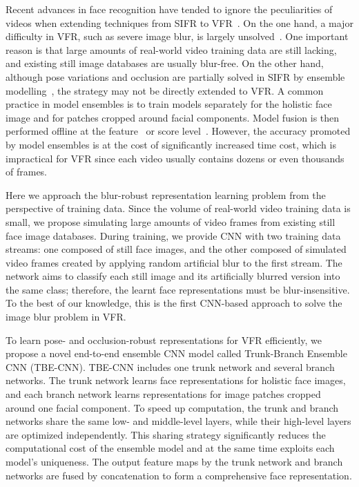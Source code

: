 \documentclass[10pt,journal,cspaper,compsoc]{IEEEtran}
\begin{document}
Recent advances in face recognition have tended to ignore the peculiarities of videos when extending techniques from SIFR to VFR~\cite{schroff2015facenet,sun2015deeply,parkhi2015deep,li2015hierarchical}.
On the one hand, a major difficulty in VFR, such as severe image blur, is largely unsolved~\cite{Ross2015report}.
One important reason is that large amounts of real-world video training data are still lacking,
and existing still image databases are usually blur-free.
On the other hand, although pose variations and occlusion are partially solved in SIFR by ensemble modelling~\cite{sun2015deeply,liu2015targeting},
the strategy may not be directly extended to VFR.
A common practice in model ensembles is to train models separately for the holistic face image and for patches cropped around facial components.
Model fusion is then performed offline at the feature~\cite{sun2014deep} or score level~\cite{ding2014multi}.
However, the accuracy promoted by model ensembles is at the cost of significantly increased time cost,
which is impractical for VFR since each video usually contains dozens or even thousands of frames.

Here we approach the blur-robust representation learning problem from the perspective of training data.
Since the volume of real-world video training data is small,
we propose simulating large amounts of video frames from existing still face image databases.
During training, we provide CNN with two training data streams:
one composed of still face images, and the other composed of simulated video frames created by applying random artificial blur to the first stream.
The network aims to classify each still image and its artificially blurred version into the same class; therefore, the learnt face representations must be blur-insensitive.
To the best of our knowledge, this is the first CNN-based approach to solve the image blur problem in VFR.

To learn pose- and occlusion-robust representations for VFR efficiently,
we propose a novel end-to-end ensemble CNN model called Trunk-Branch Ensemble CNN (TBE-CNN).
TBE-CNN includes one trunk network and several branch networks. The trunk network learns face representations for holistic face images,
and each branch network learns representations for image patches cropped around one facial component.
To speed up computation, the trunk and branch networks share the same low- and middle-level layers,
while their high-level layers are optimized independently.
This sharing strategy significantly reduces the computational cost of the ensemble model and at the same time exploits each model's uniqueness.
The output feature maps by the trunk network and branch networks are fused by concatenation to form a comprehensive face representation.
\end{document}
